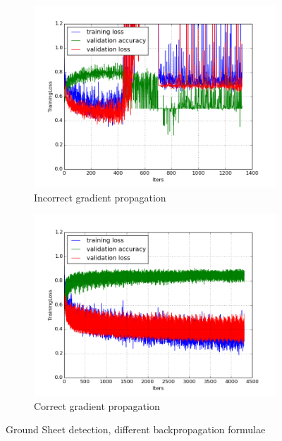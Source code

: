 \documentclass[a4paper,11pt]{article}
\begin{document}
\begin{figure}
    \centering
    \begin{minipage}[b]{\textwidth}
      \begin{subfigure}{.5\textwidth} 
        \centering
        \includegraphics[scale=0.4]{images/plot_ground_sheet_sbl_pcba.png}
        \caption{Incorrect gradient propagation}\label{fig:2a}
      \end{subfigure}%
      \begin{subfigure}{.5\textwidth} 
        \centering
        \includegraphics[scale=0.4]{images/plot_ground_sheet_sbl_pcba_all_backprop.png}
        \caption{Correct gradient propagation}\label{fig:2b}
      \end{subfigure} \par \vspace*{20pt} %
      \caption{Ground Sheet detection, different backpropagation formulae}\label{fig:2}
    \end{minipage}%
\end{figure}
\end{document}
